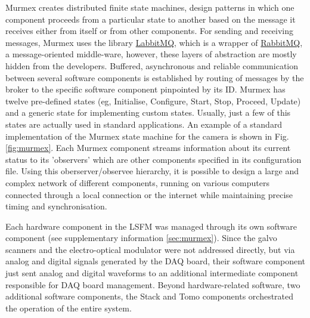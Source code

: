 \documentclass[12pt]{spieman}  %
\begin{document}
\begin{spacing}{2}
Murmex creates distributed finite state machines, design patterns in which one component proceeds from a particular state to another based on the message it receives either from itself or from other components. For sending and receiving messages, Murmex uses the library \href{http://sine.ni.com/nips/cds/view/p/lang/en/nid/211065}{LabbitMQ}, which is a wrapper of \href{http://www.rabbitmq.com/}{RabbitMQ}, a message-oriented middle-ware, however, these layers of abstraction are mostly hidden from the developers. 
Buffered, asynchronous and reliable communication between several software components is established by routing of messages by the broker to the specific software component pinpointed by its ID.
Murmex has twelve pre-defined states (eg, Initialise, Configure, Start, Stop, Proceed, Update) and a generic state for implementing custom states. Usually, just a few of this states are actually used in standard applications. An example of a standard implementation of the Murmex state machine for the camera is shown in Fig. \ref{fig:murmex}. Each Murmex component streams information about its current status to its 'observers' which are other components specified in its configuration file. Using this oberserver/observee hierarchy, it is possible to design a large and complex network of different components, running on various computers connected through a local connection or the internet while maintaining precise timing and synchronisation.

Each hardware component in the LSFM was managed through its own software component (see supplementary information \ref{sec:murmex}). Since the galvo scanners and the electro-optical modulator were not addressed directly, but via analog and digital signals generated by the DAQ board, their software component just sent analog and digital waveforms to an additional intermediate component responsible for DAQ board management. Beyond hardware-related software, two additional software components, the Stack and Tomo components orchestrated the operation of the entire system. 


\end{spacing}
\end{document}
